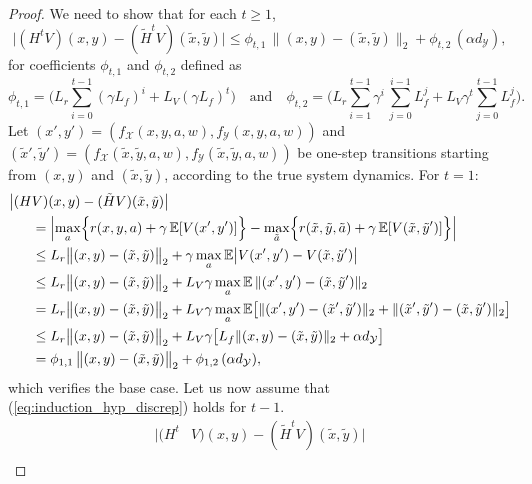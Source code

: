 \documentclass[10pt,a4paper]{amsart}
\newcommand{\E}{\mathbb{E}}
\begin{document}
\begin{proof}
We need to show that for each $t \ge 1$,
\begin{equation}
    \bigl | (H^t V)(x,y) - (\tilde{H}^t V) (\tilde{x},\tilde{y}) \bigr | \le \phi_{t, 1} \, \bigl\|(x,y)-(\tilde{x}, \tilde{y}) \bigr \|_2 + \phi_{t, 2} \, (\alpha d_\mathcal{Y}),
    \label{eq:induction_hyp_discrep}
\end{equation}
for coefficients $\phi_{t,1}$ and $\phi_{t,2}$ defined as
\[
\phi_{t,1} = \biggl(L_r \sum_{i=0}^{t-1} (\gamma L_f)^i + L_V (\gamma L_f)^t\biggr) \quad \text{and} \quad \phi_{t,2} = \biggl( L_r \sum_{i=1}^{t-1} \gamma^i \, \sum_{j=0}^{i-1} L_f^j  + L_V \gamma^t \sum_{j=0}^{t-1} L_f^j \biggr).
\]
Let $(x', y') = (f_\mathcal{X}(x,y,a,w), f_\mathcal{Y}(x,y,a,w))$ and $(\tilde{x}', \tilde{y}') = (f_\mathcal{X}(\tilde{x},\tilde{y},a,w), f_\mathcal{Y}(\tilde{x},\tilde{y},a,w))$ be one-step transitions starting from $(x,y)$ and $(\tilde{x},\tilde{y})$, according to the true system dynamics. For $t=1$:
\begin{align*}
    \bigl | (H &V)(x,y) - (\tilde{H} V) (\tilde{x},\tilde{y}) \bigr |  \\
    &= \Bigl| \max_{a} \Bigl \{ r(x,y, a) + \gamma \, \E [V (x',y')] \Bigr \} - \max_{\tilde{a}} \Bigl \{ r(\tilde{x},\tilde{y},\tilde{a}) + \gamma \, \E [V (\tilde{x}, \tilde{y}')]\Bigr \} \Bigr| \nonumber\\
    &\le  L_r \bigl \|(x, y) - (\tilde{x}, \tilde{y}) \bigr\|_2 + \gamma \max_{a}  \mathbb{E} \bigl | V(x', y') - V(\tilde{x}, \tilde{y}')  \bigr|\\
    &\le L_r \bigl \|(x, y) - (\tilde{x}, \tilde{y}) \bigr\|_2 + L_V\gamma \max_{a}  \mathbb{E} \, \| (x', y') - (\tilde{x}, \tilde{y}')  \|_2 \\
    &= L_r \bigl \|(x, y) - (\tilde{x}, \tilde{y}) \bigr\|_2 + L_V\gamma \max_{a}  \mathbb{E} \bigl [  \| (x', y') - (\tilde{x}', \tilde{y}')\|_2 + \|(\tilde{x}', \tilde{y}')- (\tilde{x}, \tilde{y}') \|_2  \bigr]\\
    &\le L_r \bigl \|(x, y) - (\tilde{x}, \tilde{y}) \bigr\|_2 + L_V\gamma \bigl [  L_f \| (x, y) - (\tilde{x}, \tilde{y})\|_2 + \alpha d_\mathcal{Y}  \bigr]\\
    &=\phi_{1, 1} \, \bigl\|(x,y)-(\tilde{x}, \tilde{y}) \bigr \|_2 + \phi_{1, 2} \, (\alpha d_\mathcal{Y}),
\end{align*}
which verifies the base case. Let us now assume that (\ref{eq:induction_hyp_discrep}) holds for $t-1$.
\begin{align*}
    \bigl | (H^t &V)(x,y) - (\tilde{H}^t V) (\tilde{x},\tilde{y}) \bigr |  \\

\end{align*}
\end{proof}
\end{document}

